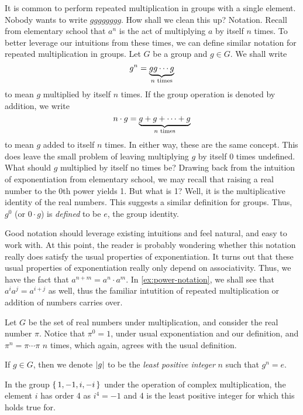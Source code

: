 \documentclass[./main.tex]{subfiles}
\begin{document}
It is common to perform repeated multiplication in groups with a single element.
Nobody wants to write $gggggggg$. How shall we clean this up? Notation. Recall
from elementary school that $a^n$ is the act of multiplying $a$ by itself $n$
times. To better leverage our intuitions from these times, we can define similar
notation for repeated multiplication in groups. Let $G$ be a group and $g \in
G$. We shall write 
\[
    g^n = {\underbrace{gg \cdots g}_{\text{$n$ times}}}
\]
to mean $g$ multiplied by itself $n$ times. If the group operation is denoted by
addition, we write 
\[
    n \cdot g = {\underbrace{g + g + \cdots + g}_{\text{$n$ times}}}
\]
to mean $g$ added to itself $n$ times. In either way, these are the same
concept. This does leave the small problem of leaving multiplying $g$ by
itself 0 times undefined. What should $g$ multiplied by itself no times be?
Drawing back from the intuition of exponentiation from elementary school, we may
recall that raising a real number to the 0th power yields 1. But what is 1?
Well, it is the multiplicative identity of the real numbers. This suggests a
similar definition for groups. Thus, $g^0$ (or $0 \cdot g$) is \emph{defined} to
be $e$, the group identity. 

Good notation should leverage existing intuitions and feel natural, and easy to
work with. At this point, the reader is probably wondering whether this notation
really does satisfy the usual properties of exponentiation. It turns out that
these usual properties of exponentiation really only depend on associativity.
Thus, we have the fact that $a^{n+m} = a^n \cdot a^m$. In
\cref{ex:power-notation}, we shall see that $a^i a^j = a^{i+j}$ as well, thus
the familiar intutition of repeated multiplication or addition of numbers
carries over.

\begin{example}
    Let $G$ be the set of real numbers under multiplication, and consider the
    real number $\pi$. Notice that $\pi^0 = 1$, under usual exponentiation and
    our definition, and $\pi^n = \pi \cdots \pi$ $n$ times, which again, agrees
    with the usual definition.
\end{example}

\begin{definition}
    If $g \in G$, then we denote $\abs g$ to be the \emph{least positive
    integer} $n$ such that $g^n = e$. 
\end{definition}

\begin{example}
    In the group $\set{1, -1, i, -i}$ under the operation of complex
    multiplication, the element $i$ has order 4 as $i^4 = -1$ and 4 is the least
    positive integer for which this holds true for.
\end{example}
\end{document}
